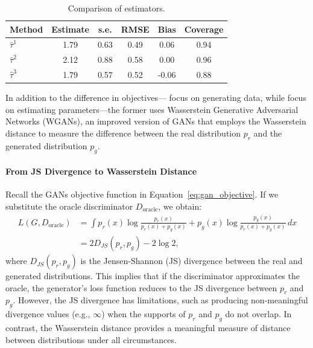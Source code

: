 \documentclass[12pt]{article}
\begin{document}
\begin{table}[h!]
    \centering
    \begin{tabular}{|l|c|c|c|c|c|}
        \hline
        \textbf{Method} & \textbf{Estimate} & \textbf{s.e.} & \textbf{RMSE} & \textbf{Bias} & \textbf{Coverage} \\
        \hline
        $\hat{\tau}^1$  & 1.79              & 0.63          & 0.49          & 0.06          & 0.94              \\
        $\hat{\tau}^2$  & 2.12              & 0.88          & 0.58          & 0.00          & 0.96              \\
        $\hat{\tau}^3$  & 1.79              & 0.57          & 0.52          & -0.06         & 0.88              \\
        \hline
    \end{tabular}
    \caption{Comparison of estimators.}
    \label{tab:estimator_comparison}
\end{table}

In addition to the difference in objectives---\citet{athey2024using} focus on
generating data, while \citet{kaji2023adversarial} focus on estimating
parameters---the former uses Wasserstein Generative Adversarial Networks
(WGANs), an improved version of GANs that employs the Wasserstein distance to
measure the difference between the real distribution \(p_r\) and the generated
distribution \(p_g\).

\paragraph{From JS Divergence to Wasserstein Distance}
Recall the GANs objective function in Equation~\ref{eq:gan_objective}. If we
substitute the oracle discriminator \(D_\text{oracle}\), we obtain:
\begin{equation*}
    \begin{split}
        L(G, D_\text{oracle}) & = \int p_r(x) \log \frac{p_r(x)}{p_r(x) + p_g(x)} + p_g(x) \log \frac{p_g(x)}{p_r(x) + p_g(x)} \, dx \\
        & = 2 D_{JS}(p_r, p_g) - 2 \log 2,
    \end{split}
\end{equation*}
where \(D_{JS}(p_r, p_g)\) is the Jensen-Shannon (JS) divergence between the real and generated distributions. This implies that if the discriminator approximates the oracle, the generator's loss function reduces to the JS divergence between \(p_r\) and \(p_g\). However, the JS divergence has limitations, such as producing non-meaningful divergence values (e.g., \(\infty\)) when the supports of \(p_r\) and \(p_g\) do not overlap. In contrast, the Wasserstein distance provides a meaningful measure of distance between distributions under all circumstances.
\end{document}
